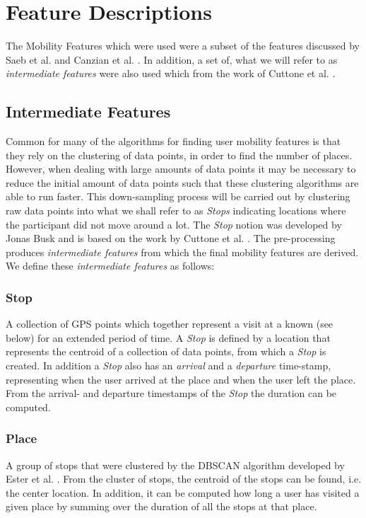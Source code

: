 \section{Feature Descriptions}
The Mobility Features which were used were a subset of the features discussed by Saeb et al. \cite{Saeb2015} and Canzian et al. \cite{Canzian2015}. In addition, a set of, what we will refer to as \textit{intermediate features} were also used which from the work of Cuttone et al. \cite{sparse-location-2014}. 

\subsection{Intermediate Features}
Common for many of the algorithms for finding user mobility features is that they rely on the clustering of data points, in order to find the number of places. However, when dealing with large amounts of data points it may be necessary to reduce the initial amount of data points such that these clustering algorithms are able to run faster. This down-sampling process will be carried out by clustering raw data points into what we shall refer to as \textit{Stops} indicating locations where the participant did not move around a lot. The \textit{Stop} notion was developed by Jonas Busk and is based on the work by Cuttone et al. \cite{sparse-location-2014}. The pre-processing produces \textit{intermediate features} from which the final mobility features are derived. We define these \textit{intermediate features} as follows:

\subsubsection*{Stop}
A collection of GPS points which together represent a visit at a known  (see below) for an extended period of time. A \textit{Stop} is defined by a location that represents the centroid of a collection of data points, from which a \textit{Stop} is created. In addition a \textit{Stop} also has an \textit{arrival} and a \textit{departure} time-stamp, representing when the user arrived at the place and when the user left the place. From the arrival- and departure timestamps of the \textit{Stop} the duration can be computed.

\subsubsection*{Place}
A group of stops that were clustered by the DBSCAN algorithm developed by Ester et al. \cite{density-based-1996}. From the cluster of stops, the centroid of the stops can be found, i.e. the center location. In addition, it can be computed how long a user has visited a given place by summing over the duration of all the stops at that place.


